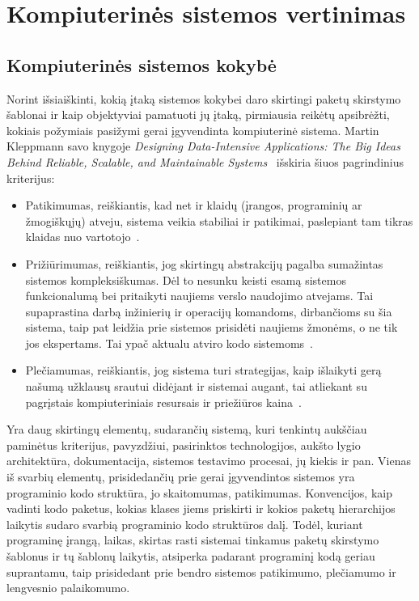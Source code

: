 \section{Kompiuterinės sistemos vertinimas}
\subsection{Kompiuterinės sistemos kokybė}
Norint išsiaiškinti, kokią įtaką sistemos kokybei daro skirtingi paketų skirstymo šablonai ir kaip objektyviai pamatuoti jų įtaką, pirmiausia
reikėtų apsibrėžti, kokiais požymiais pasižymi gerai įgyvendinta kompiuterinė sistema.
Martin Kleppmann savo knygoje \textit{Designing Data-Intensive Applications: The Big Ideas Behind Reliable, Scalable, and Maintainable Systems}~\cite{DataIntensiveApplications} išskiria šiuos pagrindinius kriterijus:
\begin{itemize}
    \item Patikimumas, reiškiantis, kad net ir klaidų (įrangos, programinių ar žmogiškųjų) atveju,
    sistema veikia stabiliai ir patikimai, paslepiant tam tikras klaidas nuo vartotojo~\cite{DataIntensiveApplications}.
    \item Prižiūrimumas, reiškiantis, jog skirtingų abstrakcijų pagalba sumažintas sistemos kompleksiškumas.
    Dėl to nesunku keisti esamą sistemos funkcionalumą bei pritaikyti naujiems verslo naudojimo atvejams.
    Tai supaprastina darbą inžinierių ir operacijų komandoms, dirbančioms su šia sistema, taip pat leidžia prie sistemos prisidėti naujiems žmonėms, o ne
    tik jos ekspertams.
    Tai ypač aktualu atviro kodo sistemoms~\cite{DataIntensiveApplications}.
    \item Plečiamumas, reiškiantis, jog sistema turi strategijas, kaip išlaikyti gerą našumą užklausų
    srautui didėjant ir sistemai augant, tai atliekant su pagrįstais kompiuteriniais resursais ir
    priežiūros kaina~\cite{DataIntensiveApplications}.
\end{itemize}
Yra daug skirtingų elementų, sudarančių sistemą, kuri tenkintų aukščiau paminėtus kriterijus,
pavyzdžiui, pasirinktos technologijos, aukšto lygio architektūra, dokumentacija, sistemos testavimo
procesai, jų kiekis ir pan.
Vienas iš svarbių elementų, prisidedančių prie gerai įgyvendintos sistemos yra programinio kodo struktūra, jo skaitomumas, patikimumas.
Konvencijos, kaip vadinti kodo paketus, kokias klases jiems priskirti ir kokios paketų hierarchijos laikytis sudaro svarbią programinio kodo struktūros dalį.
Todėl, kuriant programinę įrangą, laikas, skirtas rasti sistemai tinkamus paketų skirstymo šablonus ir tų šablonų laikytis, atsiperka padarant
programinį kodą geriau suprantamu, taip prisidedant prie bendro sistemos patikimumo, plečiamumo ir lengvesnio palaikomumo.

